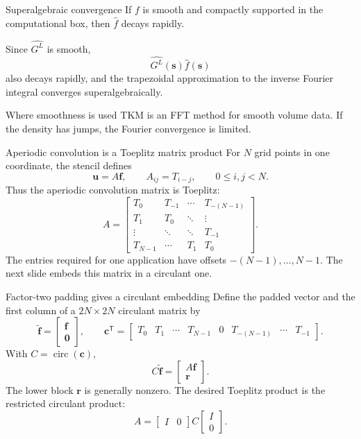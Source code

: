\documentclass[aspectratio=169,11pt]{beamer}
\newcommand{\s}{\bm{s}}
\begin{document}
\begin{frame}{Superalgebraic convergence}
\small
If $f$ is smooth and compactly supported in the computational box, then $\widehat f$ decays rapidly.

\vspace{2mm}
Since $\widehat{G^L}$ is smooth,
\[
  \widehat{G^L}(\s)\widehat f(\s)
\]
also decays rapidly, and the trapezoidal approximation to the inverse Fourier integral converges superalgebraically.

\begin{block}{Where smoothness is used}
TKM is an FFT method for smooth volume data. If the density has jumps, the Fourier convergence is limited.
\end{block}
\end{frame}

\begin{frame}{Aperiodic convolution is a Toeplitz matrix product}
\small
For $N$ grid points in one coordinate, the stencil defines
\[
  \bm u=A\bm f,
  \qquad A_{ij}=T_{i-j},\qquad 0\le i,j<N.
\]
Thus the aperiodic convolution matrix is Toeplitz:
\[
  A=\begin{bmatrix}
  T_0&T_{-1}&\cdots&T_{-(N-1)}\\
  T_1&T_0&\ddots&\vdots\\
  \vdots&\ddots&\ddots&T_{-1}\\
  T_{N-1}&\cdots&T_1&T_0
  \end{bmatrix}.
\]
The entries required for one application have offsets
$-(N-1),\ldots,N-1$.  The next slide embeds this matrix in a circulant one.
\end{frame}

\begin{frame}{Factor-two padding gives a circulant embedding}
\small
Define the padded vector and the first column of a $2N\times2N$ circulant
matrix by
\[
  \widetilde{\bm f}=\begin{bmatrix}\bm f\\\bm{0}\end{bmatrix},
  \qquad
  \bm c^{\mathsf T}
  =
  \begin{bmatrix}
  T_0&T_1&\cdots&T_{N-1}&0&T_{-(N-1)}&\cdots&T_{-1}
  \end{bmatrix}.
\]
With $C=\operatorname{circ}(\bm c)$,
\[
  C\widetilde{\bm f}=
  \begin{bmatrix}A\bm f\\\bm r\end{bmatrix}.
\]
The lower block $\bm r$ is generally nonzero.  The desired Toeplitz product is
the restricted circulant product:
\[
  A=
  \begin{bmatrix}I&0\end{bmatrix}
  C
  \begin{bmatrix}I\\0\end{bmatrix}.
\]
\end{frame}
\end{document}
